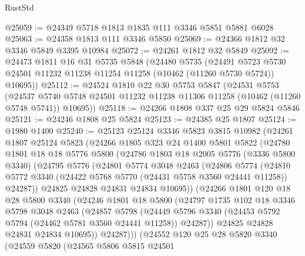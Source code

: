 \begin{lexlean}{RustStd}
\begin{coremodule}
@25059 := @24349 @5718 @1813 @1835 @111 @3346 @5851 @5881 @6028
@25063 := @24358 @1813 @111 @3346 @5850
@25069 := @24366 @1812 @32 @3346 @5849 @3395 @10984
@25072 := @24261 @1812 @32 @5849
@25092 := @24473
    @1811
    @16
    @31
    @5735
    @5848
    (@24480
      @5735
      (@24491 @5723 @5730 @24501 @11232 @11238 @11254 @11258 (@10462 (@11260 @5730 @5724)) @10695))
@25112 := @24524
    @1810
    @22
    @30
    @5753
    @5847
    (@24531
      @5753
      (@24537 @5740 @5748 @24501 @11232 @11238 @11306 @11258 (@10462 (@11260 @5748 @5741)) @10695))
@25118 := @24266 @1808 @337 @25 @29 @5824 @5846
@25121 := @24246 @1808 @25 @5824
@25123 := @24385 @25 @1807
@25124 := @1980 @1400
@25240 := @25123
    @25124
    @3346
    @5823
    @3815
    @10982
    (@24261
      @1807
      @25124
      @5823
      (@24266
        @1805
        @323
        @24
        @1400
        @5801
        @5822
        (@24780
          @1801
          @18
          @18
          @5776
          @5800
          (@24786
            @1803
            @18
            @2005
            @5776
            (@3336 @5800 @3340)
            (@24795
              @5776
              (@24801
                @5774
                @3048
                @2463
                (@24806
                  @5774
                  (@24810
                    @5772
                    @3340
                    (@24422 @5768 @5770 (@24431 @5758 @3560 @24441 @11258))
                    @24287))
                @24825
                @24828
                @24831
                @24834
                @10695))
            (@24266
              @1801
              @120
              @18
              @28
              @5800
              @3340
              (@24246
                @1801
                @18
                @5800
                (@24797
                  @1735
                  @102
                  @18
                  @3346
                  @5798
                  @3048
                  @2463
                  (@24857
                    @5798
                    (@24449
                      @5796
                      @3340
                      (@24453 @5792 @5794 (@24462 @5781 @3560 @24441 @11258))
                      @24287))
                  @24825
                  @24828
                  @24831
                  @24834
                  @10695))
              @24287)))
        (@24552
          @120
          @25
          @28
          @5820
          @3340
          (@24559
            @5820
            (@24565
              @5806
              @5815
              @24501

\end{coremodule}
\end{lexlean}
